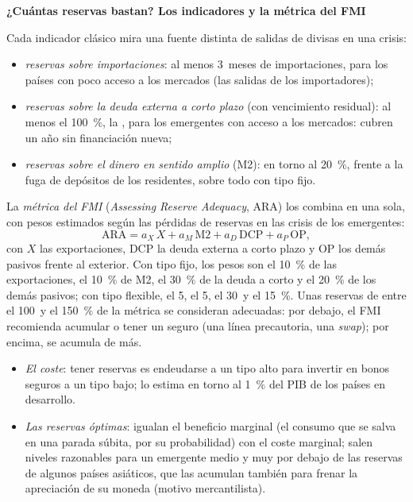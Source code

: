 \documentclass[11pt]{article}
\begin{document}
\begin{anotaciones}
\textbf{¿Cuántas reservas bastan? Los indicadores y la métrica del FMI}

Cada indicador clásico mira una fuente distinta de salidas de divisas en una crisis:
\begin{itemize}
\item \emph{reservas sobre importaciones}: al menos 3~meses de importaciones, para los países con poco acceso a los mercados (las salidas de los importadores);
\item \emph{reservas sobre la deuda externa a corto plazo} (con vencimiento residual): al menos el 100~\%, la , para los emergentes con acceso a los mercados: cubren un año sin financiación nueva\nocite{Greenspan1999Currency};
\item \emph{reservas sobre el dinero en sentido amplio} (M2): en torno al 20~\%, frente a la fuga de depósitos de los residentes, sobre todo con tipo fijo.
\end{itemize}
La \emph{métrica del FMI} (\emph{Assessing Reserve Adequacy}, ARA) los combina en una sola, con pesos estimados según las pérdidas de reservas en las crisis de los emergentes\nocite{FMI2011Reservas,FMI2015ARA}:
\[
\text{ARA}=a_X\,X+a_M\,\mathrm{M2}+a_D\,\mathrm{DCP}+a_P\,\mathrm{OP},
\]
con $X$ las exportaciones, DCP la deuda externa a corto plazo y OP los demás pasivos frente al exterior. Con tipo fijo, los pesos son el 10~\% de las exportaciones, el 10~\% de M2, el 30~\% de la deuda a corto y el 20~\% de los demás pasivos; con tipo flexible, el 5, el 5, el 30~y el 15~\%\nocite{FMI2016GuiaReservas}. Unas reservas de entre el 100~y el 150~\% de la métrica se consideran adecuadas: por debajo, el FMI recomienda acumular o tener un seguro (una línea precautoria, una \emph{swap}); por encima, se acumula de más.
\begin{itemize}
\item \emph{El coste}: tener reservas es endeudarse a un tipo alto para invertir en bonos seguros a un tipo bajo; \textcite{Rodrik2006Social} lo estima en torno al 1~\% del PIB de los países en desarrollo.
\item \emph{Las reservas óptimas}: \textcite{JeanneRanciere2011} igualan el beneficio marginal (el consumo que se salva en una parada súbita, por su probabilidad) con el coste marginal; salen niveles razonables para un emergente medio y muy por debajo de las reservas de algunos países asiáticos, que las acumulan también para frenar la apreciación de su moneda (motivo mercantilista).

\end{itemize}
\end{anotaciones}
\end{document}
